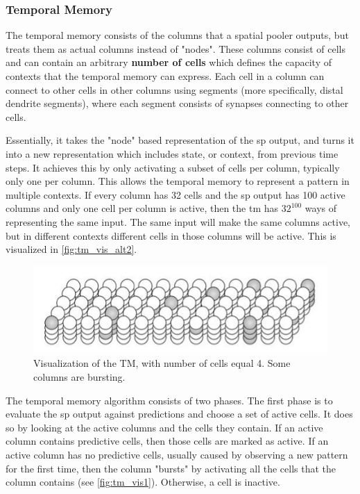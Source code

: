 \subsubsection{Temporal Memory}
\label{sec:temporal_memory}
The temporal memory consists of the columns that a spatial pooler outputs, but treats them as actual columns instead of "nodes". These columns consist of cells and can contain an arbitrary \textbf{number of cells} which defines the capacity of contexts that the temporal memory can express. Each cell in a column can connect to other cells in other columns using segments (more specifically, distal dendrite segments), where each segment consists of synapses connecting to other cells.
\par
Essentially, it takes the "node" based representation of the \gls*{sp} output, and turns it into a new representation which includes state, or context, from previous time steps. It achieves this by only activating a subset of cells per column, typically only one per column. This allows the temporal memory to represent a pattern in multiple contexts. If every column has 32 cells and the \gls*{sp} output has 100 active columns and only one cell per column is active, then the \gls*{tm} has $32^{100}$ ways of representing the same input. The same input will make the same columns active, but in different contexts different cells in those columns will be active. This is visualized in \autoref{fig:tm_vis_alt2}.
\begin{figure}[htb]
    \centering
    \includegraphics[width=0.6\linewidth]{resources/related_works/tm_vis_alt2}
    \caption[Temporal Memory Visualization]{Visualization of the TM, with number of cells equal 4. Some columns are bursting.}
    \label{fig:tm_vis_alt2}
\end{figure}
\par
The temporal memory algorithm consists of two phases. The first phase is to evaluate the \gls*{sp} output against predictions and choose a set of active cells. It does so by looking at the active columns and the cells they contain. If an active column contains predictive cells, then those cells are marked as active. If an active column has no predictive cells, usually caused by observing a new pattern for the first time, then the column "bursts" by activating all the cells that the column contains (see \autoref{fig:tm_vis1}). Otherwise, a cell is inactive.
